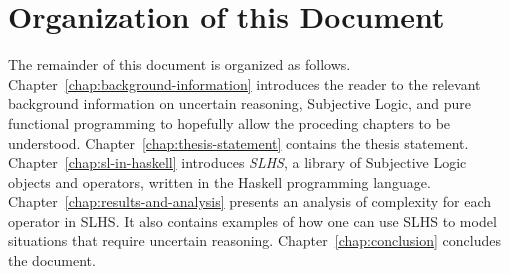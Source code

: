 \documentclass[thesis.tex]{subfiles}
\begin{document}
\section{Organization of this Document}

The remainder of this document is organized as follows.
Chapter~\ref{chap:background-information}
introduces the reader to the relevant background information on uncertain reasoning,
Subjective Logic, and pure functional programming to hopefully allow the proceding
chapters to be understood. Chapter~\ref{chap:thesis-statement} contains the thesis
statement. Chapter~\ref{chap:sl-in-haskell} introduces \emph{SLHS}, a library of
Subjective Logic objects and operators, written in the Haskell programming language.
Chapter~\ref{chap:results-and-analysis} presents an analysis of complexity for each
operator in SLHS. It also contains examples of how one can use SLHS to model situations
that require uncertain reasoning. Chapter~\ref{chap:conclusion} concludes the document.
\end{document}
